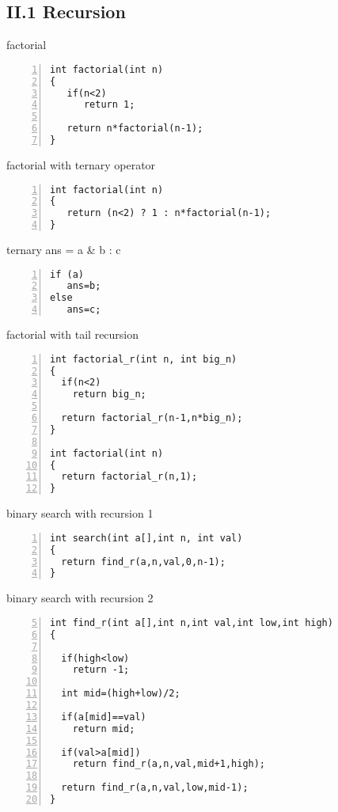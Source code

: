 \documentclass{beamer}
\begin{document}
\subsection*{II.1 Recursion}
\begin{frame}[fragile]{factorial}
\begin{lstlisting}[numbers=left]
int factorial(int n)
{
   if(n<2)
      return 1;

   return n*factorial(n-1);
}
\end{lstlisting}
\end{frame}


\begin{frame}[fragile]{factorial with ternary operator}
\begin{lstlisting}[numbers=left]
int factorial(int n)
{
   return (n<2) ? 1 : n*factorial(n-1);
}
\end{lstlisting}
\end{frame}


\begin{frame}[fragile]{ternary ans = a \& b : c }
\begin{lstlisting}[numbers=left]
if (a)
   ans=b;
else 
   ans=c;
\end{lstlisting}
\end{frame}

\begin{frame}[fragile]{factorial with tail recursion}
\begin{lstlisting}[numbers=left]
int factorial_r(int n, int big_n)
{
  if(n<2)
    return big_n;

  return factorial_r(n-1,n*big_n);
}

int factorial(int n)
{
  return factorial_r(n,1);
}
\end{lstlisting}
\end{frame}

\begin{frame}[fragile]{binary search with recursion 1}
\begin{lstlisting}[numbers=left]
int search(int a[],int n, int val)
{
  return find_r(a,n,val,0,n-1);
}
\end{lstlisting}
\end{frame}

\begin{frame} [fragile]{binary search with recursion 2}
\begin{lstlisting}[numbers=left,firstnumber=5]
int find_r(int a[],int n,int val,int low,int high)
{

  if(high<low)
    return -1;

  int mid=(high+low)/2;

  if(a[mid]==val)
    return mid;

  if(val>a[mid])
    return find_r(a,n,val,mid+1,high);
  
  return find_r(a,n,val,low,mid-1);
}
\end{lstlisting}
\end{frame}
\end{document}
